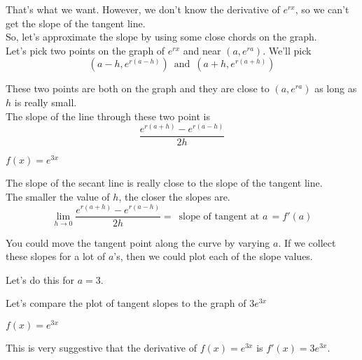 \documentclass{ximera}
\begin{document}
That's what we want.  However, we don't know the derivative of $e^{r x}$, so we can't get the slope of the tangent line. \\

So, let's approximate the slope by using some close chords on the graph. \\



Let's pick two points on the graph of $e^{r x}$ and near $(a, e^{r a})$.  We'll pick
\[
(a-h, e^{r(a-h)}) \, \text{ and } \, (a+h, e^{r(a+h)})
\]

These two points are both on the graph and they are close to $(a, e^{r a})$ as long as $h$ is really small. \\

The slope of the line through these two point is 
\[
\frac{e^{r(a+h)} - e^{r(a-h)}}{2h}
\]




\begin{example}  $f(x) = e^{3 x}$

\begin{center}
\end{center}

\end{example}





The slope of the secant line is really close to the slope of the tangent line. \\

The smaller the value of $h$, the closer the slopes are. \\


\[
\lim_{h \to 0} \frac{e^{r(a+h)} - e^{r(a-h)}}{2h} = \, \text{ slope of tangent at }a \, = f'(a)
\]


You could move the tangent point along the curve by varying $a$.  If we collect these slopes for a lot of $a$'s, then we could plot each of the slope values.



Let's do this for $a = 3$.

\begin{example}



Let's compare the plot of tangent slopes to the graph of $3 e^{3 x}$



\begin{example}  $f(x) = e^{3 x}$

\begin{center}
\end{center}

\end{example}





This is very suggestive that the derivative of $f(x) = e^{3 x}$ is $f'(x) = 3 e^{3 x}$.



\end{example}
\end{document}
